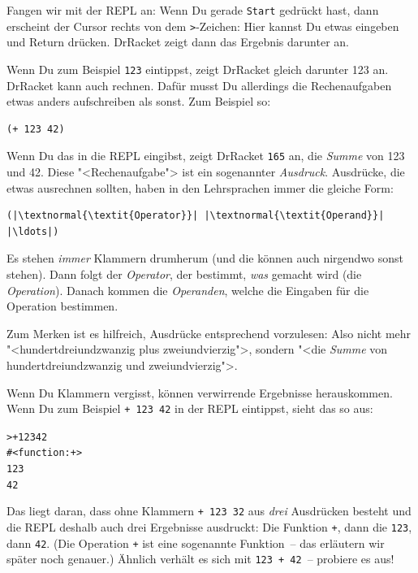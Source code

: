Fangen wir mit der REPL an: Wenn Du gerade \texttt{Start} gedrückt
hast, dann erscheint der Cursor rechts von dem \lstinline{>}-Zeichen:
Hier kannst Du etwas eingeben und Return drücken.  DrRacket zeigt dann
das Ergebnis darunter an.

Wenn Du zum Beispiel \lstinline{123} eintippst, zeigt DrRacket gleich
darunter 123 an.  DrRacket kann auch rechnen.  Dafür musst Du
allerdings die Rechenaufgaben etwas anders aufschreiben als sonst.
Zum Beispiel so:
%
\begin{lstlisting}
(+ 123 42)
\end{lstlisting}
%
Wenn Du das in die REPL eingibst, zeigt DrRacket \lstinline{165} an, die
\textit{Summe} von 123 und 42.  Diese "<Rechenaufgabe">
ist ein sogenannter \textit{Ausdruck}.  Ausdrücke, die
etwas ausrechnen sollten, haben in den Lehrsprachen immer die gleiche
Form:
%
\begin{lstlisting}
(|\textnormal{\textit{Operator}}| |\textnormal{\textit{Operand}}| |\ldots|)
\end{lstlisting}
%
Es stehen \emph{immer} Klammern drumherum
(und die können auch nirgendwo sonst stehen).  Dann folgt der
\textit{Operator}, der bestimmt, \emph{was} gemacht
wird (die \textit{Operation}).  Danach kommen die
\textit{Operanden}, welche die Eingaben
für die Operation bestimmen.

Zum Merken ist es hilfreich, Ausdrücke entsprechend vorzulesen: Also
nicht mehr "<hundertdreiundzwanzig plus zweiundvierzig">, sondern
"<die \emph{Summe} von hundertdreiundzwanzig und zweiundvierzig">.

Wenn Du Klammern vergisst,
können verwirrende Ergebnisse herauskommen.  Wenn Du zum Beispiel
\lstinline{+ 123 42} in der REPL eintippst, sieht das so aus:
%
\begin{alltt}
> + {\color{DarkGreen}123 42}
{\color{blue}#<function:+>
123
42}
\end{alltt}
%
Das liegt daran, dass ohne Klammern \lstinline{+ 123 32} aus \emph{drei}
Ausdrücken besteht und die REPL deshalb auch drei Ergebnisse ausdruckt:
Die Funktion \lstinline{+}, dann die \lstinline{123}, dann \lstinline{42}.
(Die Operation \lstinline{+} ist eine sogenannte Funktion~-- das
erläutern wir später noch genauer.)  Ähnlich verhält es sich mit
\lstinline{123 + 42}~-- probiere es aus!

